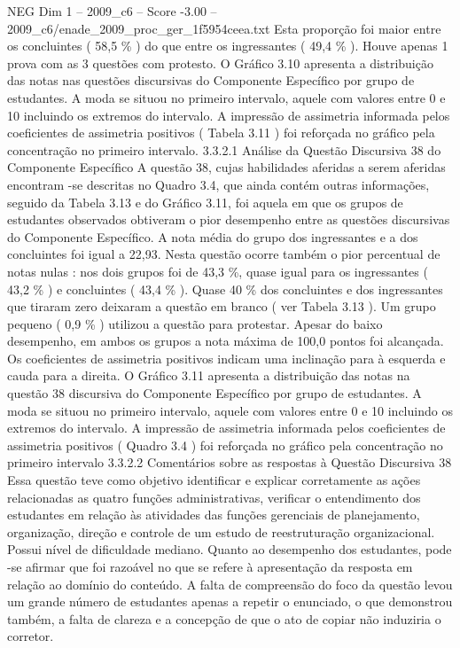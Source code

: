 \begin{textsample}{NEG Dim 1 – 2009\_c6 – Score -3.00 – 2009\_c6/enade\_2009\_proc\_ger\_1f5954ceea.txt}
Esta proporção foi maior entre os concluintes ( 58,5 \% ) do que entre os ingressantes ( 49,4 \% ).
Houve apenas 1 prova com as 3 questões com protesto.
O Gráfico 3.10 apresenta a distribuição das notas nas questões discursivas do Componente Específico por grupo de estudantes.
A moda se situou no primeiro intervalo, aquele com valores entre 0 e 10 incluindo os extremos do intervalo.
A impressão de assimetria informada pelos coeficientes de assimetria positivos ( Tabela 3.11 ) foi reforçada no gráfico pela concentração no primeiro intervalo. 3.3.2.1 Análise da Questão Discursiva 38 do Componente Específico A questão 38, cujas habilidades aferidas a serem aferidas encontram -se descritas no Quadro 3.4, que ainda contém outras informações, seguido da Tabela 3.13 e do Gráfico 3.11, foi aquela em que os grupos de estudantes observados obtiveram o pior desempenho entre as questões discursivas do Componente Específico.
A nota média do grupo dos ingressantes e a dos concluintes foi igual a 22,93.
Nesta questão ocorre também o pior percentual de notas nulas : nos dois grupos foi de 43,3 \%, quase igual para os ingressantes ( 43,2 \% ) e concluintes ( 43,4 \% ).
Quase 40 \% dos concluintes e dos ingressantes que tiraram zero deixaram a questão em branco ( ver Tabela 3.13 ).
Um grupo pequeno ( 0,9 \% ) utilizou a questão para protestar.
Apesar do baixo desempenho, em ambos os grupos a nota máxima de 100,0 pontos foi alcançada.
Os coeficientes de assimetria positivos indicam uma inclinação para à esquerda e cauda para a direita.
O Gráfico 3.11 apresenta a distribuição das notas na questão 38 discursiva do Componente Específico por grupo de estudantes.
A moda se situou no primeiro intervalo, aquele com valores entre 0 e 10 incluindo os extremos do intervalo.
A impressão de assimetria informada pelos coeficientes de assimetria positivos ( Quadro 3.4 ) foi reforçada no gráfico pela concentração no primeiro intervalo 3.3.2.2 Comentários sobre as respostas à Questão Discursiva 38 Essa questão teve como objetivo identificar e explicar corretamente as ações relacionadas as quatro funções administrativas, verificar o entendimento dos estudantes em relação às atividades das funções gerenciais de planejamento, organização, direção e controle de um estudo de reestruturação organizacional.
Possui nível de dificuldade mediano.
Quanto ao desempenho dos estudantes, pode -se afirmar que foi razoável no que se refere à apresentação da resposta em relação ao domínio do conteúdo.
A falta de compreensão do foco da questão levou um grande número de estudantes apenas a repetir o enunciado, o que demonstrou também, a falta de clareza e a concepção de que o ato de copiar não induziria o corretor.

\end{textsample}
